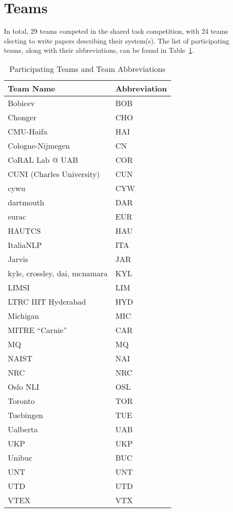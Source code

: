 \documentclass[11pt,letterpaper]{article}
\begin{document}
\section{Teams}
\label{sec-teams}
In total, 29 teams competed in the shared task competition, with 24 teams
electing to write papers describing their system(s).  The list
of participating teams, along with their abbreviations, can be
found in Table~\ref{tab:teams}.


\begin{table}[!ht]
\begin{small}
\begin{center}
\begin{tabular}{|l|l|}
\hline
\textbf{Team Name} & \textbf{Abbreviation} \\ \hline
Bobicev & BOB  \\ \hline
Chonger & CHO  \\ \hline
CMU-Haifa & HAI  \\ \hline
Cologne-Nijmegen &  CN \\ \hline
CoRAL Lab @ UAB &  COR \\ \hline
CUNI (Charles University) &  CUN \\ \hline
cywu &  CYW \\ \hline
dartmouth & DAR  \\ \hline
eurac & EUR  \\ \hline
HAUTCS & HAU  \\ \hline
ItaliaNLP &  ITA \\ \hline
Jarvis &   JAR\\ \hline
kyle, crossley, dai, mcnamara & KYL  \\ \hline
LIMSI & LIM  \\ \hline
LTRC IIIT Hyderabad &  HYD \\ \hline
Michigan &  MIC \\ \hline
MITRE ``Carnie'' & CAR  \\ \hline
MQ &   MQ\\ \hline
NAIST &  NAI \\ \hline
NRC &  NRC \\ \hline
Oslo NLI & OSL  \\ \hline
Toronto &  TOR \\ \hline
Tuebingen &   TUE\\ \hline
Ualberta &  UAB \\ \hline
UKP &  UKP \\ \hline
Unibuc &  BUC \\ \hline
UNT &   UNT\\ \hline
UTD &  UTD \\ \hline
VTEX &  VTX \\ \hline

\end{tabular}
\end{center}
\end{small}
\caption{Participating Teams and Team Abbreviations\label{tab:teams}}

\end{table}
\end{document}
